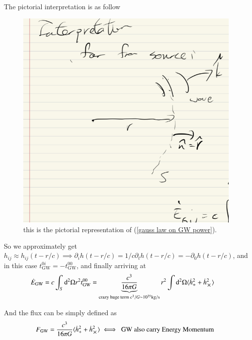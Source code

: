 \documentclass[a4paper, 12pt]{article}
\begin{document}
The pictorial interpretation is as follow 
\begin{figure}[h!]
\begin{center}
  \includegraphics[scale=0.3]{Figures/pictorial_interpretation.jpeg}
\end{center}
\caption{this is the pictorial representation of (\ref{gauss law on GW
  power}).}
\label{fig: pictorial representation on gauss law on GW power}
\end{figure}

So we approximately get \( h_{ij} \approx h_{ij}(t - r/c) \implies
\partial_{i}^{} h(t-r/c) = 1/c \partial_{t}^{} h (t -r/c) = -
\partial_{0}^{}h(t-r/c) \), and in this case \(
t_{\mathrm{GW}}^{0i} = - t_{\mathrm{GW}}^{00} \), and finally arriving at 
\begin{align}
  \label{GW final power expression }
  \dot{E}_{\mathrm{GW}} &= c \int_S \mathrm{d}^{2}\Omega r^2
  t_{\mathrm{GW}}^{00} = \underbrace{\frac{c^3}{16 \pi
  G}}_{\textrm{crazy huge term } c^3/G \sim 
  10^{35}\mathrm{kg/s}} r^2 \int
  \mathrm{d}^{2}\Omega \langle \dot{h}_{+}^{2} +
  \dot{h}_{\cross}^{2} \rangle
\end{align}

And the flux can be simply defined as 
\begin{align}
  \label{Flux GW}
  F_{\mathrm{GW}} = \frac{c^3}{16 \pi G} \langle \dot{h}_{+}^{2} +
  \dot{h}_{\cross}^{2} \rangle \iff \textnormal{ GW also carry Energy Momentum }
\end{align}
\end{document}
